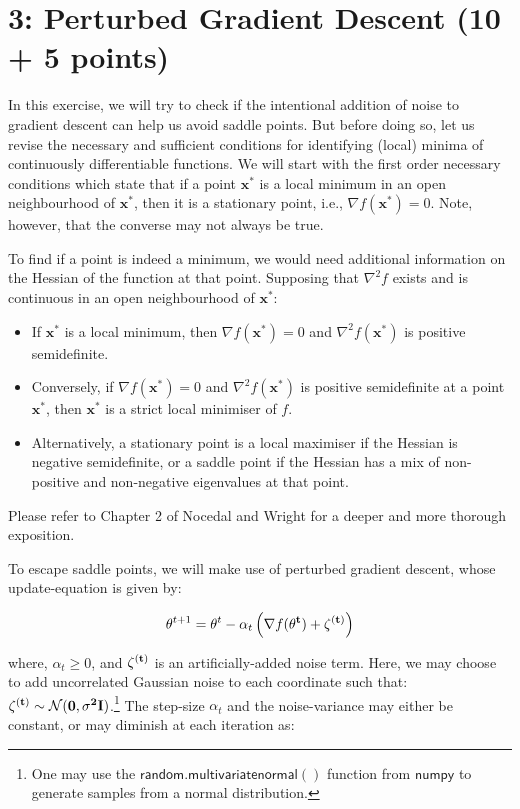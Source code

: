 \documentclass{article}
\begin{document}
\newpage

\part*{3: Perturbed Gradient Descent (10 + 5 points)}

In this exercise, we will try to check if the intentional addition of noise to gradient descent can help us avoid saddle points. But before doing so, let us revise the necessary and sufficient conditions for identifying (local) minima of continuously differentiable functions. We will start with the first order necessary conditions which state that if a point $\mathbf{x^*}$ is a local minimum in an open neighbourhood of $\mathbf{x^*}$, then it is a stationary point, i.e., $\nabla f(\mathbf{x^*}) = 0$. Note, however, that the converse may not always be true.

To find if a point is indeed a minimum, we would need additional information on the Hessian of the function at that point. Supposing that $\nabla^2 f$ exists and is continuous in an open neighbourhood of $\mathbf{x^*}$:

\begin{itemize}
    \item If $\mathbf{x^*}$ is a local minimum, then $\nabla f(\mathbf{x^*}) = 0$ and $\nabla^2 f(\mathbf{x^*})$ is positive semidefinite.
    \item Conversely, if $\nabla f(\mathbf{x^*}) = 0$ and $\nabla^2 f(\mathbf{x^*})$ is positive semidefinite at a point $\mathbf{x^*}$, then $\mathbf{x^*}$ is a strict local minimiser of $f$.
    \item Alternatively, a stationary point is a local maximiser if the Hessian is negative semidefinite, or a saddle point if the Hessian has a mix of non-positive and non-negative eigenvalues at that point.
\end{itemize}

Please refer to Chapter 2 of Nocedal and Wright for a deeper and more thorough exposition.

To escape saddle points, we will make use of perturbed gradient descent, whose update-equation is given by:

$$
    \mathbf{\theta}^{t + 1} = \mathbf{\theta}^{t} - \alpha_t \left(\nabla f(\bf{\theta}^{t}) + \bf{\zeta}^{(t)}\right)
$$

where, $\alpha_t \geq 0$, and $\bf{\zeta}^{(t)}$ is an artificially-added noise term. Here, we may choose to add uncorrelated Gaussian noise to each coordinate such that: $\bf{\zeta}^{(t)} \sim \mathcal{N}(\mathbf{0}, \sigma^2\mathbf{I})$.\footnote{One may use the $\mathsf{random.multivariate normal()}$ function from $\mathsf{numpy}$ to generate samples from a normal distribution.} The step-size $\alpha_t$ and the noise-variance may either be constant, or may diminish at each iteration as:
\end{document}

